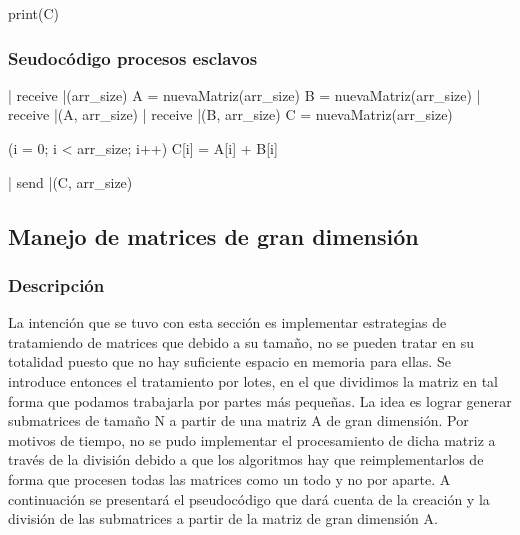 \documentclass{article}
\begin{document}
\begin{program}
    print(C) 
\end{program}

\subsubsection{Seudocódigo procesos esclavos}

\begin{program}
    | receive |(arr\_size) 
    A = nuevaMatriz(arr\_size) 
    B = nuevaMatriz(arr\_size)
    | receive |(A, arr\_size)  
    | receive |(B, arr\_size)
    C = nuevaMatriz(arr\_size) 
\end{program}

\begin{program}
    \FOR (i = 0; i < arr\_size; i++) 
    C[i] = A[i] + B[i]
\end{program}

\begin{program}
    | send |(C, arr\_size) 
\end{program}

\subsection{Manejo de matrices de gran dimensión}

\subsubsection{Descripción}

La intención que se tuvo con esta sección es implementar estrategias de tratamiendo de matrices
que debido a su tamaño, no se pueden tratar en su totalidad puesto que no hay suficiente espacio
en memoria para ellas. Se introduce entonces el tratamiento por lotes, en el que dividimos la matriz
en tal forma que podamos trabajarla por partes más pequeñas. La idea es lograr generar submatrices de tamaño N
a partir de una matriz A de gran dimensión. Por motivos de tiempo, no se pudo implementar el procesamiento
de dicha matriz a través de la división debido a que los algoritmos hay que reimplementarlos de forma
que procesen todas las matrices como un todo y no por aparte. A continuación se presentará el pseudocódigo que dará cuenta de
la creación y la división de las submatrices a partir de la matriz de gran dimensión A.
\end{document}
